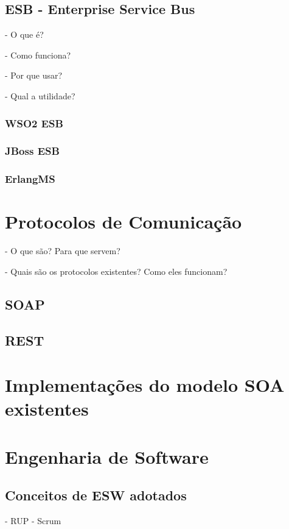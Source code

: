 \subsection{ESB - Enterprise Service Bus}

- O que é?

- Como funciona?

- Por que usar?

- Qual a utilidade?


\subsubsection{WSO2 ESB}


\subsubsection{JBoss ESB}


\subsubsection{ErlangMS}

\section{Protocolos de Comunicação}
- O que são? Para que servem?

- Quais são os protocolos existentes? Como eles funcionam?

\subsection{SOAP}

\subsection{REST}

\section{Implementações do modelo SOA existentes}

\section{Engenharia de Software}

\subsection{Conceitos de ESW adotados}
- RUP
- Scrum